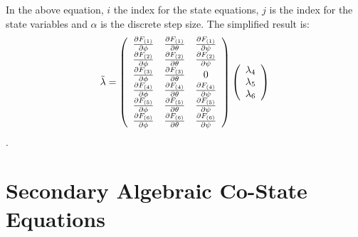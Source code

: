 In the above equation, $i$ the index for the state equations, $j $ is the index for the state variables and $\alpha $ is the discrete step size. The simplified result is:
\begin{equation}
    \ddot \lambda = \left(
    \begin{array}{c c c c c c}
    \frac{\partial F_{(1)}}{\partial \phi} & \frac{\partial F_{(1)}}{\partial \theta} & \frac{\partial F_{(1)}}{\partial \psi}\\
    \frac{\partial F_{(2)}}{\partial \phi} & \frac{\partial F_{(2)}}{\partial \theta} & \frac{\partial F_{(2)}}{\partial \psi}\\
    \frac{\partial F_{(3)}}{\partial \phi} & \frac{\partial F_{(3)}}{\partial \theta} & 0\\
    \frac{\partial F_{(4)}}{\partial \phi} & \frac{\partial F_{(4)}}{\partial \theta} & \frac{\partial F_{(4)}}{\partial \psi}\\
    \frac{\partial F_{(5)}}{\partial \phi} & \frac{\partial F_{(5)}}{\partial \theta} & \frac{\partial F_{(5)}}{\partial \psi}\\
    \frac{\partial F_{(6)}}{\partial \phi} & \frac{\partial F_{(6)}}{\partial \theta} & \frac{\partial F_{(6)}}{\partial \psi}\\
    \end{array}\right)\left(\begin{array}{c} \lambda_4\\  \lambda_5\\ \lambda_6\\ \end{array}\right)
\end{equation}.

\section{Secondary Algebraic Co-State Equations}

